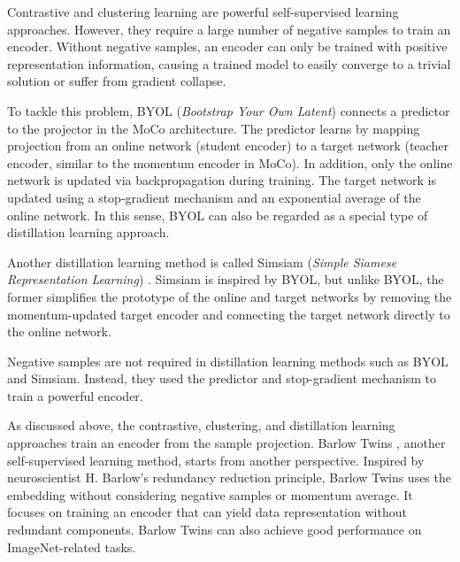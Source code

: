 Contrastive and clustering learning are powerful self-supervised learning approaches. However, they require a large number of negative samples to train an encoder. Without negative samples, an encoder can only be trained with positive representation information, causing a trained model to easily converge to a trivial solution or suffer from gradient collapse. 


To tackle this problem, BYOL (\textit{Bootstrap Your Own Latent}) \cite{BYOL} connects a predictor to the projector in the MoCo architecture. The predictor learns by mapping projection from an online network (student encoder) to a target network (teacher encoder, similar to the momentum encoder in MoCo). In addition, only the online network is updated via backpropagation during training. The target network is updated using a stop-gradient mechanism and an exponential average of the online network. In this sense, BYOL can also be regarded as a special type of distillation learning approach. 



Another distillation learning method is called Simsiam (\textit{Simple Siamese Representation Learning}) \cite{Simsiam}. Simsiam is inspired by BYOL, but unlike BYOL, the former simplifies the prototype of the online and target networks by removing the momentum-updated target encoder and connecting the target network directly to the online network. 



Negative samples are not required in distillation learning methods such as BYOL and Simsiam. Instead, they used the predictor and stop-gradient mechanism to train a powerful encoder.


As discussed above, the contrastive, clustering, and distillation learning approaches train an encoder from the sample projection. Barlow Twins \cite{BarlowTwins}, another self-supervised learning method, starts from another perspective. Inspired by neuroscientist H. Barlow's redundancy reduction principle, Barlow Twins uses the embedding without considering negative samples or momentum average. It focuses on training an encoder that can yield data representation without redundant components. Barlow Twins can also achieve good performance on ImageNet-related tasks.



